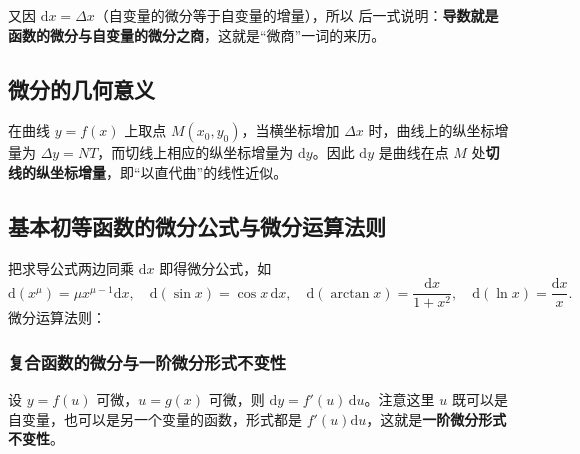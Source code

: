 
\noindent 又因 $\mathrm{d}x=\Delta x$（自变量的微分等于自变量的增量），所以
\noindent 后一式说明：\textbf{导数就是函数的微分与自变量的微分之商}，这就是“微商”一词的来历。


\subsection{微分的几何意义}
在曲线 $y=f(x)$ 上取点 $M(x_0,y_0)$，当横坐标增加 $\Delta x$ 时，曲线上的纵坐标增量为 $\Delta y=NT$，而切线上相应的纵坐标增量为 $\mathrm{d}y$。因此 $\mathrm{d}y$ 是曲线在点 $M$ 处\textbf{切线的纵坐标增量}，即“以直代曲”的线性近似。

\subsection{基本初等函数的微分公式与微分运算法则}
把求导公式两边同乘 $\mathrm{d}x$ 即得微分公式，如
\[
\mathrm{d}(x^{\mu})=\mu x^{\mu-1}\mathrm{d}x,\quad \mathrm{d}(\sin x)=\cos x\,\mathrm{d}x,\quad
\mathrm{d}(\arctan x)=\frac{\mathrm{d}x}{1+x^2},\quad \mathrm{d}(\ln x)=\frac{\mathrm{d}x}{x}.
\]
微分运算法则：

\subsubsection{复合函数的微分与一阶微分形式不变性}
设 $y=f(u)$ 可微，$u=g(x)$ 可微，则 $\mathrm{d}y=f'(u)\,\mathrm{d}u$。注意这里 $u$ 既可以是自变量，也可以是另一个变量的函数，形式都是 $f'(u)\mathrm{d}u$，这就是\textbf{一阶微分形式不变性}。



